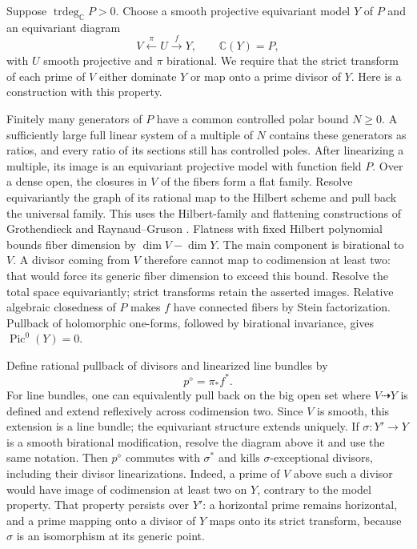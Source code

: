 Suppose $\operatorname{trdeg}_{\mathbb C}P>0$.
Choose a smooth projective equivariant model $Y$
of $P$ and an equivariant diagram
\begin{equation}\label{V:controlled-model}
 V\xleftarrow{\pi}U\xrightarrow{f}Y,
 \qquad \mathbb C(Y)=P,
\end{equation}
with $U$ smooth projective and $\pi$ birational.  We require that the
strict transform of each prime of $V$ either dominate $Y$ or map onto a
prime divisor of $Y$.  Here is a construction with this property.

Finitely many generators of $P$ have a common controlled polar bound
$N\ge0$.  A sufficiently large full linear system of a multiple of
$N$ contains these generators as ratios, and every ratio of its sections
still has controlled poles.  After linearizing a multiple, its image is
an equivariant projective model with function field $P$.  Over a dense
open, the closures in $V$ of the fibers form a flat family.  Resolve
equivariantly the graph of its rational map to the Hilbert scheme and
pull back the universal family.  This uses the Hilbert-family and
flattening constructions of Grothendieck and Raynaud--Gruson
\cite{Grothendieck1961Hilbert,RaynaudGruson1971}.
Flatness with fixed Hilbert polynomial
bounds fiber dimension by $\dim V-\dim Y$.  The main component is
birational to $V$.  A divisor coming from $V$ therefore cannot map to
codimension at least two: that would force its generic fiber dimension
to exceed this bound.  Resolve the total space equivariantly; strict
transforms retain the asserted images.  Relative algebraic closedness of
$P$ makes $f$ have connected fibers by Stein factorization.  Pullback of
holomorphic one-forms, followed by birational invariance, gives
$\operatorname{Pic}^0(Y)=0$.

Define rational pullback of divisors and linearized line bundles by
\[
 p^\diamond=\pi_*f^*.
\]
For line bundles, one can equivalently pull back on the big open set
where $V\dashrightarrow Y$ is defined and extend reflexively across
codimension two.  Since $V$ is smooth, this extension is a line bundle;
the equivariant structure extends uniquely.  If
$\sigma:Y'\to Y$ is a smooth birational modification, resolve the
diagram above it and use the same notation.  Then $p^\diamond$
commutes with $\sigma^*$ and kills $\sigma$-exceptional divisors,
including their divisor linearizations.  Indeed, a prime of $V$ above
such a divisor would have image of codimension at least two on $Y$,
contrary to the model property.  That property persists over $Y'$:
a horizontal prime remains horizontal, and a prime mapping onto a
divisor of $Y$ maps onto its strict transform, because $\sigma$ is
an isomorphism at its generic point.


